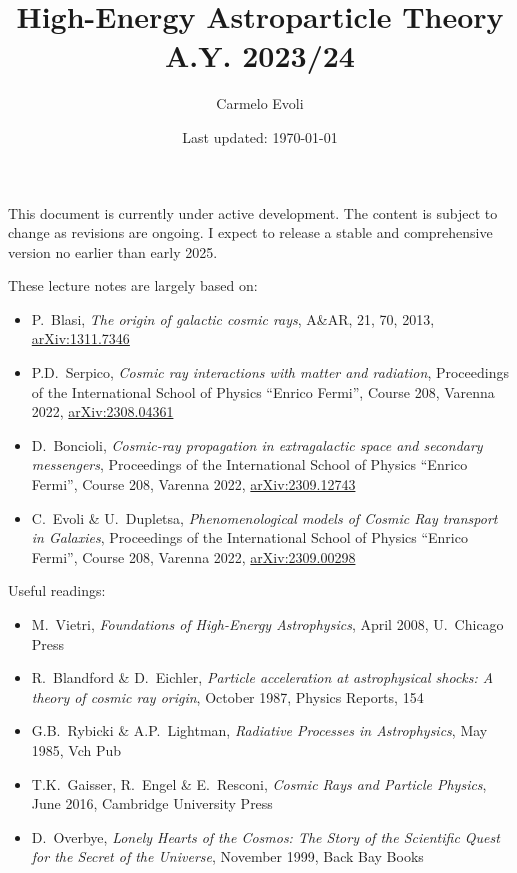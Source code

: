 \documentclass[letterpaper, 11pt, notitlepage]{report}
\begin{document}
\title{High-Energy Astroparticle Theory \\[1em]
\normalsize A.Y. 2023/24}

\author{\normalsize Carmelo Evoli}
\date{\normalsize\vspace{-1ex} Last updated: \today}

\maketitle

\vspace{0.25cm}
{\color{red}\large This document is currently under active development. The content is subject to change as revisions are ongoing. I expect to release a stable and comprehensive version no earlier than early 2025.}
\vspace{0.25cm}

These lecture notes are largely based on:
%
\begin{itemize}
\item P.~Blasi, \emph{The origin of galactic cosmic rays}, A\&AR, 21, 70, 2013, \href{https://arxiv.org/abs/1311.7346}{arXiv:1311.7346}
\item P.D.~Serpico, \emph{Cosmic ray interactions with matter and radiation}, Proceedings of the International School of Physics ``Enrico Fermi'', Course 208, Varenna 2022, \href{https://arxiv.org/abs/2308.04361}{arXiv:2308.04361}
\item D.~Boncioli, \emph{Cosmic-ray propagation in extragalactic space and secondary messengers}, Proceedings of the International School of Physics ``Enrico Fermi'', Course 208, Varenna 2022, \href{https://arxiv.org/abs/2309.12743}{arXiv:2309.12743}
\item C.~Evoli \& U.~Dupletsa, \emph{Phenomenological models of Cosmic Ray transport in Galaxies}, Proceedings of the International School of Physics ``Enrico Fermi'', Course 208, Varenna 2022, \href{https://arxiv.org/abs/2309.00298}{arXiv:2309.00298}
\end{itemize}

Useful readings:
%
\begin{itemize}
\item M.~Vietri, \emph{Foundations of High-Energy Astrophysics}, April 2008, U.~Chicago Press
\item R.~Blandford \& D.~Eichler, \emph{Particle acceleration at astrophysical shocks: A theory of cosmic ray origin},  October 1987, Physics Reports, 154
\item G.B.~Rybicki \& A.P.~Lightman, \emph{Radiative Processes in Astrophysics}, May 1985, Vch Pub
\item T.K.~Gaisser, R.~Engel \& E.~Resconi, \emph{Cosmic Rays and Particle Physics}, June 2016, Cambridge University Press
\item D.~Overbye, \emph{Lonely Hearts of the Cosmos: The Story of the Scientific Quest for the Secret of the Universe}, November 1999, Back Bay Books
\end{itemize}
\end{document}
